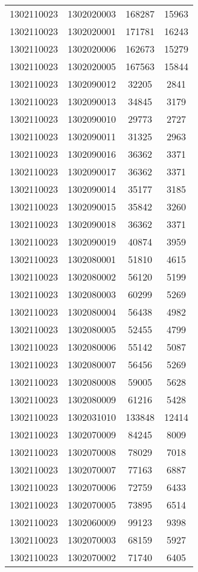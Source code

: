 \begin{longtable}{llcc}
1302110023 & 1302020003 & 168287 & 15963\\
1302110023 & 1302020001 & 171781 & 16243\\
1302110023 & 1302020006 & 162673 & 15279\\
1302110023 & 1302020005 & 167563 & 15844\\
1302110023 & 1302090012 & 32205 & 2841\\
1302110023 & 1302090013 & 34845 & 3179\\
1302110023 & 1302090010 & 29773 & 2727\\
1302110023 & 1302090011 & 31325 & 2963\\
1302110023 & 1302090016 & 36362 & 3371\\
1302110023 & 1302090017 & 36362 & 3371\\
1302110023 & 1302090014 & 35177 & 3185\\
1302110023 & 1302090015 & 35842 & 3260\\
1302110023 & 1302090018 & 36362 & 3371\\
1302110023 & 1302090019 & 40874 & 3959\\
1302110023 & 1302080001 & 51810 & 4615\\
1302110023 & 1302080002 & 56120 & 5199\\
1302110023 & 1302080003 & 60299 & 5269\\
1302110023 & 1302080004 & 56438 & 4982\\
1302110023 & 1302080005 & 52455 & 4799\\
1302110023 & 1302080006 & 55142 & 5087\\
1302110023 & 1302080007 & 56456 & 5269\\
1302110023 & 1302080008 & 59005 & 5628\\
1302110023 & 1302080009 & 61216 & 5428\\
1302110023 & 1302031010 & 133848 & 12414\\
1302110023 & 1302070009 & 84245 & 8009\\
1302110023 & 1302070008 & 78029 & 7018\\
1302110023 & 1302070007 & 77163 & 6887\\
1302110023 & 1302070006 & 72759 & 6433\\
1302110023 & 1302070005 & 73895 & 6514\\
1302110023 & 1302060009 & 99123 & 9398\\
1302110023 & 1302070003 & 68159 & 5927\\
1302110023 & 1302070002 & 71740 & 6405\\

\end{longtable}
